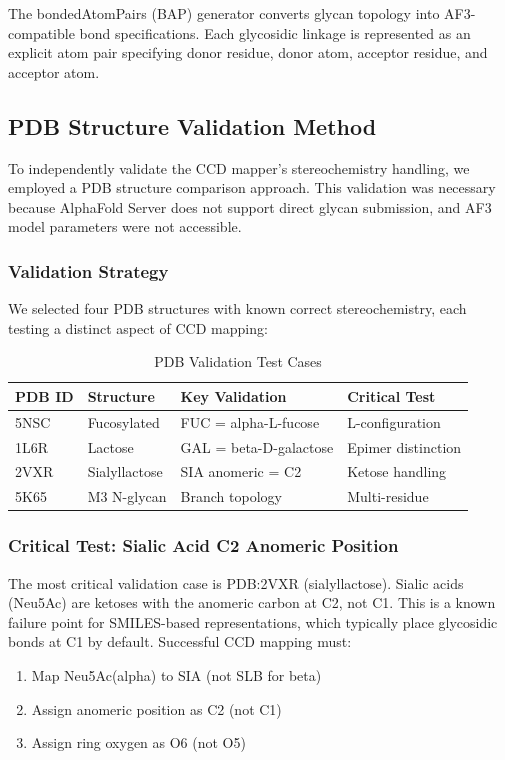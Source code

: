 The bondedAtomPairs (BAP) generator converts glycan topology into AF3-compatible bond specifications. Each glycosidic linkage is represented as an explicit atom pair specifying donor residue, donor atom, acceptor residue, and acceptor atom.

\subsection{PDB Structure Validation Method}
\label{sec:pdb_validation}

To independently validate the CCD mapper's stereochemistry handling, we employed a PDB structure comparison approach. This validation was necessary because AlphaFold Server does not support direct glycan submission, and AF3 model parameters were not accessible.

\subsubsection{Validation Strategy}

We selected four PDB structures with known correct stereochemistry, each testing a distinct aspect of CCD mapping:

\begin{table}[h]
\centering
\caption{PDB Validation Test Cases}
\begin{tabular}{llll}
\toprule
PDB ID & Structure & Key Validation & Critical Test \\
\midrule
5NSC & Fucosylated & FUC = alpha-L-fucose & L-configuration \\
1L6R & Lactose & GAL = beta-D-galactose & Epimer distinction \\
2VXR & Sialyllactose & SIA anomeric = C2 & Ketose handling \\
5K65 & M3 N-glycan & Branch topology & Multi-residue \\
\bottomrule
\end{tabular}
\label{tab:pdb_cases}
\end{table}

\subsubsection{Critical Test: Sialic Acid C2 Anomeric Position}

The most critical validation case is PDB:2VXR (sialyllactose). Sialic acids (Neu5Ac) are ketoses with the anomeric carbon at C2, not C1. This is a known failure point for SMILES-based representations, which typically place glycosidic bonds at C1 by default. Successful CCD mapping must:
\begin{enumerate}
\item Map Neu5Ac(alpha) to SIA (not SLB for beta)
\item Assign anomeric position as C2 (not C1)
\item Assign ring oxygen as O6 (not O5)
\end{enumerate}

